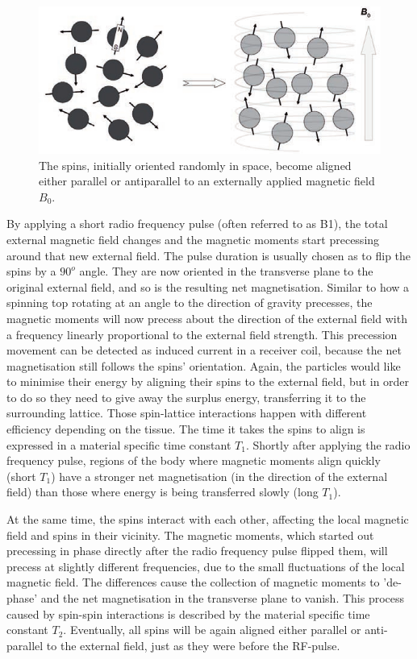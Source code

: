 \begin{figure}[h!]
\centering
\includegraphics[width=0.8\linewidth]{../fig/intro/spin_align}
\caption{The spins, initially oriented randomly in space, become aligned either parallel or antiparallel to an externally applied magnetic field $B_0$. \cite{Maidment2014}}
\label{fig:spin_align}
\end{figure}

By applying a short radio frequency pulse (often referred to as B1), the total external magnetic field changes and the magnetic moments start precessing around that new external field.
The pulse duration is usually chosen as to flip the spins by a $90^o$ angle.
They are now oriented in the transverse plane to the original external field, and so is the resulting net magnetisation.
Similar to how a spinning top rotating at an angle to the direction of gravity precesses, the magnetic moments will now precess about the direction of the external field with a frequency linearly proportional to the external field strength.
This precession movement can be detected as induced current in a receiver coil, because the net magnetisation still follows the spins' orientation. 
Again, the particles would like to minimise their energy by aligning their spins to the external field, but in order to do so they need to give away the surplus energy, transferring it to the surrounding lattice.
Those spin-lattice interactions happen with different efficiency depending on the tissue.
The time it takes the spins to align is expressed in a material specific time constant $T_1$.
Shortly after applying the radio frequency pulse, regions of the body where magnetic moments align quickly (short $T_1$) have a stronger net magnetisation (in the direction of the external field) than those where energy is being transferred slowly (long $T_1$).

At the same time, the spins interact with each other, affecting the local magnetic field and spins in their vicinity.
The magnetic moments, which started out precessing in phase directly after the radio frequency pulse flipped them, will precess at slightly different frequencies, due to the small fluctuations of the local magnetic field.
The differences cause the collection of magnetic moments to 'de-phase' and the net magnetisation in the transverse plane to vanish.
This process caused by spin-spin interactions is described by the material specific time constant $T_2$.
Eventually, all spins will be again aligned either parallel or anti-parallel to the external field, just as they were before the RF-pulse.

